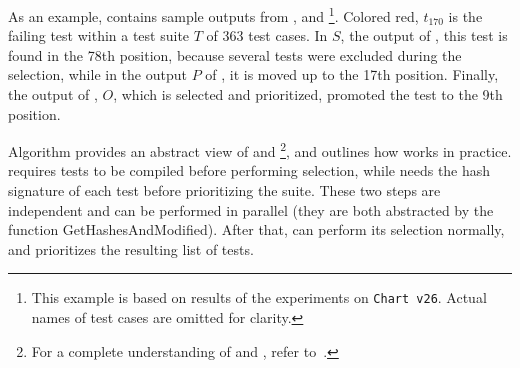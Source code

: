 As an example,  contains sample outputs from \ek, \fs and \fz\footnote{This example is based on results of the experiments on \texttt{Chart v26}. Actual names of test cases are omitted for clarity.}.
Colored red, $t_{170}$ is the failing test within a test suite $T$ of 363 test cases.
In $S$, the output of \ek, this test is found in the 78th position, because several tests were excluded during the selection, while in the output $P$ of \fs, it is moved up to the 17th position.
Finally, the output of \fz, $O$, which is selected and prioritized, promoted the test to the 9th position.

Algorithm  provides an abstract view of \ek and \fs\footnote{For a complete understanding of \ek and \fs, refer to~\cite{gligoricEk,miranda_fast}.}, and outlines how \fz works in practice.
\ek requires tests to be compiled before performing selection, while \fs needs the hash signature of each test before prioritizing the suite.
These two steps are independent and can be performed in parallel (they are both abstracted by the function GetHashesAndModified).
After that, \ek can perform its selection normally, and \fs prioritizes the resulting list of tests.





